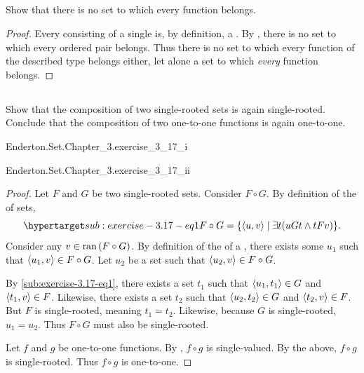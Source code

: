 \documentclass{report}
\begin{document}
\subsection{}%

  Show that there is no set to which every function belongs.

  \begin{proof}
    Every  consisting of a single
       is, by definition, a .
    By , there is no set to which every ordered pair
      belongs.
    Thus there is no set to which every function of the described type belongs
      either, let alone a set to which \textit{every} function belongs.
  \end{proof}

\subsection{}%

  Show that the composition of two single-rooted sets is again single-rooted.
  Conclude that the composition of two one-to-one functions is again one-to-one.

    {Enderton.Set.Chapter\_3.exercise\_3\_17\_i}

    {Enderton.Set.Chapter\_3.exercise\_3\_17\_ii}

  \begin{proof}
    Let $F$ and $G$ be two single-rooted sets.
    Consider $F \circ G$.
    By definition of the  of sets,
      \begin{equation}
        \hyperlabel{sub:exercise-3.17-eq1}
        F \circ G = \{\tuple{u, v} \mid \exists t(uGt \land tFv)\}.
      \end{equation}
    Consider any $v \in \mathop{\text{ran}}{(F \circ G)}$.
    By definition of the  of a , there
      exists some $u_1$ such that $\left< u_1, v \right> \in F \circ G$.
    Let $u_2$ be a set such that $\left< u_2, v \right> \in F \circ G$.

    By \eqref{sub:exercise-3.17-eq1}, there exists a set $t_1$ such that
      $\left< u_1, t_1 \right> \in G$ and $\left< t_1, v \right> \in F$.
    Likewise, there exists a set $t_2$ such that
      $\left< u_2, t_2 \right> \in G$ and $\left< t_2, v \right> \in F$.
    But $F$ is single-rooted, meaning $t_1 = t_2$.
    Likewise, because $G$ is single-rooted, $u_1 = u_2$.
    Thus $F \circ G$ must also be single-rooted.

    \suitdivider

    Let $f$ and $g$ be one-to-one functions.
    By , $f \circ g$ is single-valued.
    By the above, $f \circ g$ is single-rooted.
    Thus $f \circ g$ is one-to-one.
  \end{proof}
\end{document}
